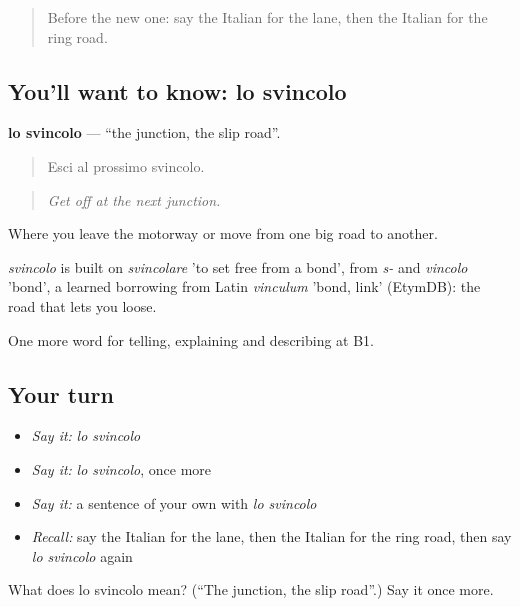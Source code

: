 \begin{quote}
Before the new one: say the Italian for the lane, then the Italian for the ring road.
\end{quote}

\subsection*{You'll want to know: lo svincolo}
\textbf{lo svincolo} — \textquotedblleft{}the junction, the slip road\textquotedblright{}.

\begin{quote}
Esci al prossimo svincolo.
\end{quote}

\begin{quote}
\emph{Get off at the next junction.}
\end{quote}

Where you leave the motorway or move from one big road to another.

\begin{cousinweb}
\emph{svincolo} is built on \emph{svincolare} 'to set free from a bond', from \emph{s-} and \emph{vincolo} 'bond', a learned borrowing from Latin \emph{vinculum} 'bond, link' (EtymDB): the road that lets you loose.
\end{cousinweb}

\begin{grammarlens}[title={What you've built}]
One more word for telling, explaining and describing at B1.
\end{grammarlens}

\subsection*{Your turn}
\begin{itemize}
\raggedright
  \item \emph{Say it:} \emph{lo svincolo}
  \item \emph{Say it:} \emph{lo svincolo}, once more
  \item \emph{Say it:} a sentence of your own with \emph{lo svincolo}
  \item \emph{Recall:} say the Italian for the lane, then the Italian for the ring road, then say \emph{lo svincolo} again
\end{itemize}

\begin{tcolorbox}[breakable,colback=teal!4,colframe=teal!35!black,title={Before you move on}]
What does lo svincolo mean? (\textquotedblleft{}The junction, the slip road\textquotedblright{}.) Say it once more.
\end{tcolorbox}
